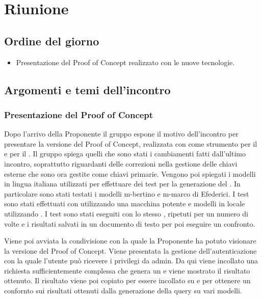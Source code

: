 \section{Riunione}
\subsection{Ordine del giorno}
\begin{itemize}
	\item Presentazione del Proof of Concept realizzato con le nuove tecnologie.
\end{itemize}

\subsection{Argomenti e temi dell'incontro}

\subsubsection{Presentazione del Proof of Concept}

\par Dopo l'arrivo della Proponente il gruppo espone il motivo dell'incontro per presentare la versione del Proof of Concept, realizzata con  come strumento per il  e  per il .
Il gruppo spiega quelli che sono stati i cambiamenti fatti dall'ultimo incontro, soprattutto riguardanti delle correzioni nella gestione delle chiavi esterne che sono ora gestite come chiavi primarie.
Vengono poi spiegati i modelli in lingua italiana utilizzati per effettuare dei test per la generazione del . In particolare sono stati testati i modelli m-bertino e m-marco di Efederici. I test sono stati effettuati con  utilizzando una macchina potente e modelli in locale utilizzando . 
I test sono stati eseguiti con lo stesso , ripetuti per un numero di volte e i risultati salvati in un documento di testo per poi eseguire un confronto.

\par Viene poi avviata la condivisione con la quale la Proponente ha potuto visionare la versione del Proof of Concept. Viene presentata la gestione dell'autenticazione con la quale l'utente può ricevere i privilegi da admin. 
Da qui viene incollato una richiesta sufficientemente complessa che genera un  e viene mostrato il risultato ottenuto.
Il risultato viene poi copiato per essere incollato su  e  per ottenere un confornto sui risultati ottenuti dalla generazione della query su vari modelli.

